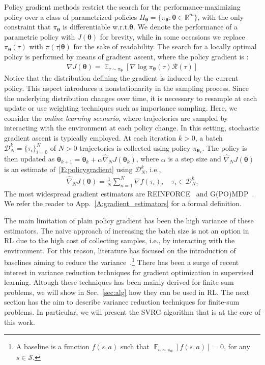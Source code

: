 \documentclass{article}
\makeatletter
\theoremstyle{remark}
\theoremstyle{definition}
\DeclareRobustCommand{\eg}{e.g.,\@\xspace}
\DeclareRobustCommand{\ie}{i.e.,\@\xspace}
\DeclareRobustCommand{\wrt}{w.r.t.\@\xspace}
\newcommand{\todopirout}[1]{\todo[color=blued]{\scriptsize #1}}
\newcommand{\realspace}{\mathbb R}      %
\DeclareMathOperator*{\EV}{\mathbb{E}}
\newcommand{\EVV}[2][\ppvect \in \ppspace]{\EV_{#1}\left[{#2}\right]}
\newcommand{\de}{\,\mathrm{d}}
\newcommand{\vtheta}{\boldsymbol{\theta}}
\newcommand{\Sspace}{\mathcal{S}}
\newcommand{\Tspace}{\mathcal{T}}
\newcommand{\Reward}{\mathcal{R}}
\newcommand{\pol}{\pi_{\vtheta}}
\newcommand{\score}[2]{\nabla\log\pi_{#1}(#2)}
\newcommand{\gradJ}[1]{\nabla J(#1)}
\newcommand{\gradApp}[2]{\widehat{\nabla}_{#2}J(#1)}
\makeatother
\begin{document}
Policy gradient methods restrict the search for the performance-maximizing policy over a class of parametrized policies $\Pi_{\vtheta}=\{\pol: \vtheta \in \realspace^m\}$, with the only constraint that $\pol$ is differentiable \wrt $\vtheta$. We denote the performance of a parametric policy with $J(\vtheta)$ for brevity, while in some occasions we replace $\pol(\tau)$ with $\pi(\tau|\vtheta)$ for the sake of readability.\todopirout{See if it used}
The search for a locally optimal policy is performed by means of gradient ascent, where the policy gradient
is \cite{sutton2000policy, Peters2008reinf}:
\begin{align} \label{E:policygradient}
        \gradJ{\vtheta} = \EVV[\tau \sim \pol]{\score{\vtheta}{\tau}\Reward(\tau)}
\end{align}
Notice that the distribution defining the gradient is induced by the current policy. This aspect introduces a nonstationarity in the sampling process. Since the underlying distribution changes over time, it is necessary to resample at each update or use weighting techniques such as importance sampling.
Here, we consider the \emph{online learning scenario}, where trajectories are sampled by interacting with the environment at each policy change. 
In this setting, stochastic gradient ascent is typically employed.
At each iteration $k >0$, a batch $\mathcal{D}_N^k = \{\tau_i\}_{i=0}^N$ of $N>0$ trajectories is collected using policy $\pi_{\vtheta_k}$.
The policy is then updated as $\vtheta_{k+1}  = \vtheta_k + \alpha\gradApp{\vtheta_k}{N}$, where $\alpha$ is a step size and $\gradApp{\vtheta}{N}$ is an estimate of~\eqref{E:policygradient} using $\mathcal{D}_N^k$, \ie
\begin{align} \label{E:policygradient.estimate}
        \gradApp{\vtheta}{N} = \frac{1}{N}\sum_{n=1}^{N} \nabla f(\tau_i), \quad \tau_i \in \mathcal{D}_N^k.
\end{align}
The most widespread gradient estimators are REINFORCE~\citep{williams1992simple} and G(PO)MDP~\citep{baxter2001infinite}.
We refer the reader to App.~\ref{A:gradient_estimators} for a formal definition.

The main limitation of plain policy gradient has been the high variance of these estimators.
The naive approach of increasing the batch size is not an option in RL due to the high cost of collecting samples, \ie by interacting with the environment.
For this reason, literature has focused on the introduction of baselines aiming to reduce the variance~\citep[\eg][]{Peters2008reinf,Thomas2017actionbaseline,wu2018variance}.\footnote{A baseline is a function $f(s,a)$ such that $\EVV[a \sim \pol]{f(s,a)} = 0$, for any $s\in\Sspace$.}
There has been a surge of recent interest in variance reduction techniques for gradient optimization in supervised learning.
Altough these techniques has been mainly derived for finite-sum problems, we will show in Sec.~\ref{sec:alg} how they can be used in RL.
The next section has the aim to describe variance reduction techniques for finite-sum problems. In particular, we will present the SVRG algorithm that is at the core of this work.
\end{document}
